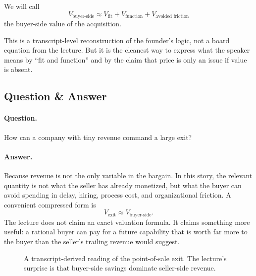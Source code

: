\begin{definition}
We will call
\begin{equation}
V_{\text{buyer-side}}
\approx
V_{\text{fit}} + V_{\text{function}} + V_{\text{avoided friction}}
\end{equation}
the buyer-side value of the acquisition.
\end{definition}

\begin{remark}
This is a transcript-level reconstruction of the founder's logic, not a board equation from the lecture. But it is the cleanest way to express what the speaker means by ``fit and function'' and by the claim that price is only an issue if value is absent.
\end{remark}

\subsection{Question \& Answer}

\paragraph{Question.} How can a company with tiny revenue command a large exit?

\paragraph{Answer.} Because revenue is not the only variable in the bargain. In this story, the relevant quantity is not what the seller has already monetized, but what the buyer can avoid spending in delay, hiring, process cost, and organizational friction. A convenient compressed form is
\begin{equation}
V_{\text{exit}} \approx V_{\text{buyer-side}}.
\end{equation}
The lecture does not claim an exact valuation formula. It claims something more useful: a rational buyer can pay for a future capability that is worth far more to the buyer than the seller's trailing revenue would suggest.

\begin{figure}[h]
\centering
{}
\caption{A transcript-derived reading of the point-of-sale exit. The lecture's surprise is that buyer-side savings dominate seller-side revenue.}
\end{figure}

